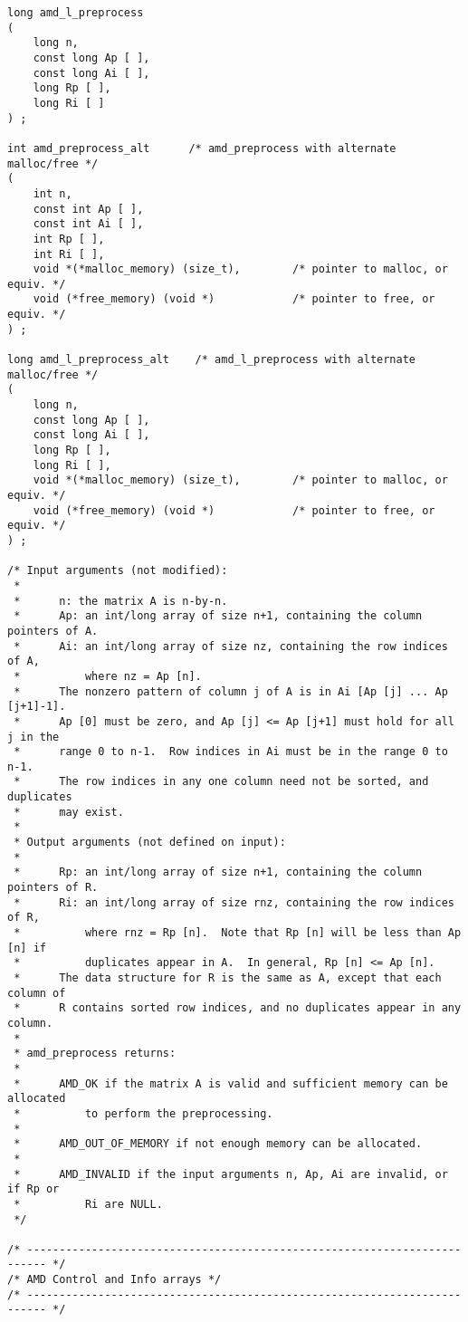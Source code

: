 \documentclass[11pt]{article}
\begin{document}
{\begin{verbatim}
long amd_l_preprocess
(
    long n,
    const long Ap [ ],
    const long Ai [ ],
    long Rp [ ],
    long Ri [ ]
) ;

int amd_preprocess_alt      /* amd_preprocess with alternate malloc/free */
(
    int n,
    const int Ap [ ],
    const int Ai [ ],
    int Rp [ ],
    int Ri [ ],
    void *(*malloc_memory) (size_t),        /* pointer to malloc, or equiv. */
    void (*free_memory) (void *)            /* pointer to free, or equiv. */
) ;

long amd_l_preprocess_alt    /* amd_l_preprocess with alternate malloc/free */
(
    long n,
    const long Ap [ ],
    const long Ai [ ],
    long Rp [ ],
    long Ri [ ],
    void *(*malloc_memory) (size_t),        /* pointer to malloc, or equiv. */
    void (*free_memory) (void *)            /* pointer to free, or equiv. */
) ;

/* Input arguments (not modified):
 *
 *      n: the matrix A is n-by-n.
 *      Ap: an int/long array of size n+1, containing the column pointers of A.
 *      Ai: an int/long array of size nz, containing the row indices of A,
 *          where nz = Ap [n].
 *      The nonzero pattern of column j of A is in Ai [Ap [j] ... Ap [j+1]-1].
 *      Ap [0] must be zero, and Ap [j] <= Ap [j+1] must hold for all j in the
 *      range 0 to n-1.  Row indices in Ai must be in the range 0 to n-1.
 *      The row indices in any one column need not be sorted, and duplicates
 *      may exist.
 *
 * Output arguments (not defined on input):
 *
 *      Rp: an int/long array of size n+1, containing the column pointers of R.
 *      Ri: an int/long array of size rnz, containing the row indices of R,
 *          where rnz = Rp [n].  Note that Rp [n] will be less than Ap [n] if
 *          duplicates appear in A.  In general, Rp [n] <= Ap [n].
 *      The data structure for R is the same as A, except that each column of
 *      R contains sorted row indices, and no duplicates appear in any column.
 *
 * amd_preprocess returns:
 *
 *      AMD_OK if the matrix A is valid and sufficient memory can be allocated
 *          to perform the preprocessing.
 *
 *      AMD_OUT_OF_MEMORY if not enough memory can be allocated.
 *
 *      AMD_INVALID if the input arguments n, Ap, Ai are invalid, or if Rp or
 *          Ri are NULL.
 */

/* ------------------------------------------------------------------------- */
/* AMD Control and Info arrays */
/* ------------------------------------------------------------------------- */


\end{verbatim}}
\end{document}
